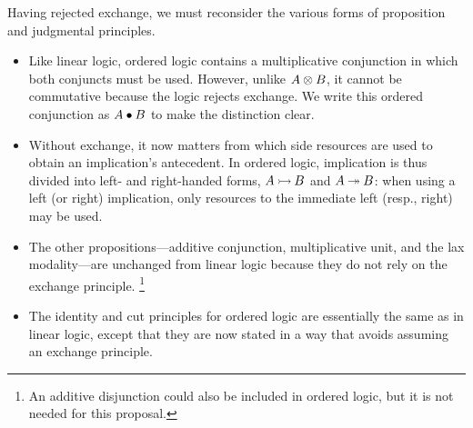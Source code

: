 Having rejected exchange, we must reconsider the various forms of proposition and judgmental principles.
\begin{itemize}
\item Like linear logic, ordered logic contains a multiplicative conjunction in which both conjuncts must be used.
      However, unlike $A \otimes B$, it cannot be commutative because the logic rejects exchange.
      We write this ordered conjunction as $A \bullet B$ to make the distinction clear.
%
\item
      Without exchange, it now matters from which side resources are used to obtain an implication's antecedent.
      In ordered logic, implication is thus divided into left- and right-handed forms, $A \mathbin{\rightarrowtail} B$ and $A \mathbin{\twoheadrightarrow} B$: 
      when using a left (or right) implication, only resources to the immediate left (resp., right) may be used.
%
\item The other propositions---additive conjunction, multiplicative unit, and the lax modality---are unchanged from linear logic because they do not rely on the exchange principle.%
      \footnote{An additive disjunction could also be included in ordered logic, but it is not needed for this proposal.}
%
\item The identity and cut principles for ordered logic are essentially the same as in linear logic, except that they are now stated in a way that avoids assuming an exchange principle.
\end{itemize}

